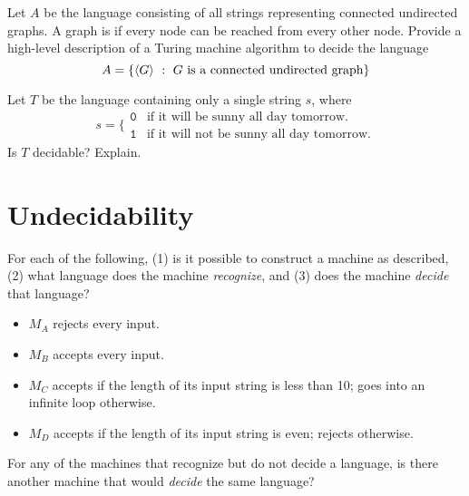 \documentclass[twoside,letterpaper,openany]{book}
\begin{document}
\begin{exer1}  %
Let $A$ be the language consisting of all strings representing connected undirected graphs. A graph is  if every node can be reached from every other node. Provide a high-level description of a Turing machine algorithm to decide the language
\[ A = \left\lbrace {\langle{G}\rangle}\ :\ G~\textrm{is a connected undirected graph} \right\rbrace \]
\end{exer1}

\begin{exer2}
Let $T$ be the language containing only a single string $s$, where
\[ s = \bigg\{
\begin{array}{ll}
\texttt{0} &  \textrm{if it will be sunny all day tomorrow.} \\
\texttt{1} & \textrm{if it will not be sunny all day tomorrow.}
\end{array}
\]
Is $T$ decidable? Explain. 
\end{exer2}

\clearpage

\section{Undecidability}

\begin{exer2}
For each of the following, (1) is it possible to construct a machine as described, (2) what language does the machine \emph{recognize}, and (3) does the machine \emph{decide} that language?

\begin{itemize}
\item $M_{A}$  rejects every input.
\item $M_{B}$  accepts every input.
\item $M_{C}$ accepts if the length of its input string is less than 10; goes into an infinite loop otherwise.
\item $M_{D}$ accepts if the length of its input string is even; rejects otherwise.
\end{itemize}

For any of the machines that recognize but do not decide a language, is there another machine that would \emph{decide} the same language?

\end{exer2}
\end{document}
